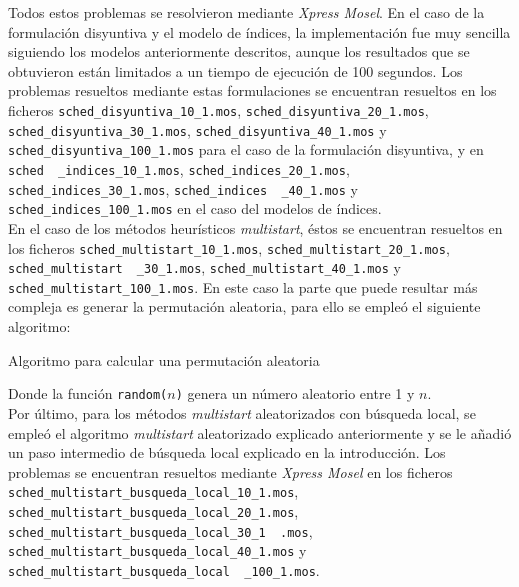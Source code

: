 \documentclass[a4paper,11pt]{article}
\begin{document}
Todos estos problemas se resolvieron mediante \textit{Xpress Mosel}. En el caso de la formulación disyuntiva y el modelo de índices, la implementación fue muy sencilla siguiendo los modelos anteriormente descritos, aunque los resultados que se obtuvieron están limitados a un tiempo de ejecución de 100 segundos. Los problemas resueltos mediante estas formulaciones se encuentran resueltos en los ficheros \texttt{sched\_disyuntiva\_10\_1.mos}, \texttt{sched\_disyuntiva\_20\_1.mos}, \texttt{sched\_disyuntiva\_30\_1.mos}, \texttt{sched\_disyuntiva\_40\_1.mos} y \texttt{sched\_disyuntiva\_100\_1.mos} para el caso de la formulación disyuntiva, y en \texttt{sched \ \_indices\_10\_1.mos}, \texttt{sched\_indices\_20\_1.mos}, \texttt{sched\_indices\_30\_1.mos}, \texttt{sched\_indices \ \_40\_1.mos} y \texttt{sched\_indices\_100\_1.mos} en el caso del modelos de índices.\\

En el caso de los métodos heurísticos \textit{multistart}, éstos se encuentran resueltos en los ficheros \texttt{sched\_multistart\_10\_1.mos}, \texttt{sched\_multistart\_20\_1.mos}, \texttt{sched\_multistart \ \_30\_1.mos}, \texttt{sched\_multistart\_40\_1.mos} y \texttt{sched\_multistart\_100\_1.mos}. En este caso la parte que puede resultar más compleja es generar la permutación aleatoria, para ello se empleó el siguiente algoritmo:

\begin{center}
\begin{algorithm}[H]
    \label{alg:permutacion_aleatoria}
    \caption{Algoritmo para calcular una permutación aleatoria}
    
    \SetAlgoLined\DontPrintSemicolon
	
    
\end{algorithm}
\end{center}

Donde la función \texttt{random($n$)} genera un número aleatorio entre 1 y $n$.\\

Por último, para los métodos \textit{multistart} aleatorizados con búsqueda local, se empleó el algoritmo \textit{multistart} aleatorizado explicado anteriormente y se le añadió un paso intermedio de búsqueda local explicado en la introducción. Los problemas se encuentran resueltos mediante \textit{Xpress Mosel} en los ficheros \texttt{sched\_multistart\_busqueda\_local\_10\_1.mos}, \texttt{sched\_multistart\_busqueda\_local\_20\_1.mos}, \texttt{sched\_multistart\_busqueda\_local\_30\_1 \ .mos}, \texttt{sched\_multistart\_busqueda\_local\_40\_1.mos} y \texttt{sched\_multistart\_busqueda\_local \ \_100\_1.mos}.
\end{document}
